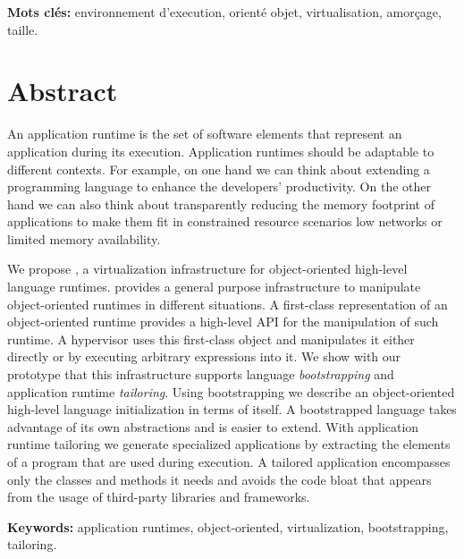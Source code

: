 \documentclass[a4paper,11pt,twoside]{include/ThesisStyle}
\begin{document}
\noindent\textbf{Mots cl\'es:} environnement d'execution, orienté objet, virtualisation, amorçage, taille.

\section*{Abstract}
\footnotesize
An application runtime is the set of software elements that represent an application during its execution. Application runtimes should be adaptable to different contexts. For example, on one hand we can think about extending a programming language to enhance the developers' productivity. On the other hand we can also think about transparently reducing the memory footprint of applications to make them fit in constrained resource scenarios \eg low networks or limited memory availability.

We propose \Vtt, a virtualization infrastructure for object-oriented high-level language runtimes. \Vtt provides a general purpose infrastructure to manipulate object-oriented runtimes in different situations. A first-class representation of an object-oriented runtime provides a high-level API for the manipulation of such runtime. A hypervisor uses this first-class object and manipulates it either directly or by executing arbitrary expressions into it.
We show with our prototype that this infrastructure supports language \emph{bootstrapping} and application runtime \emph{tailoring}. Using bootstrapping we describe an object-oriented high-level language initialization in terms of itself. A bootstrapped language takes advantage of its own abstractions and is easier to extend. With application runtime tailoring we generate specialized applications by extracting the elements of a program that are used during execution. A tailored application encompasses only the classes and methods it needs and avoids the code bloat that appears from the usage of third-party libraries and frameworks.\newline

\noindent\textbf{Keywords:} application runtimes, object-oriented, virtualization, bootstrapping, tailoring.

\thispagestyle{empty}
\end{document}

